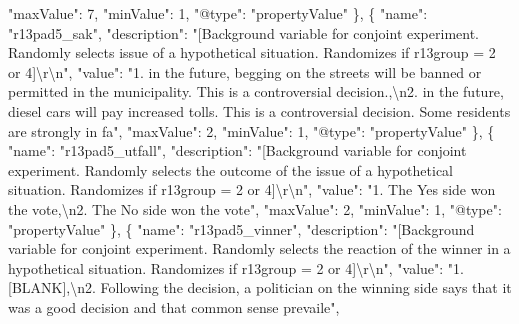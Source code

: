 \documentclass[
]{book}
\newenvironment{Shaded}{\begin{snugshade}}{\end{snugshade}}
\newcommand{\CharTok}[1]{\textcolor[rgb]{0.31,0.60,0.02}{#1}}
\newcommand{\DataTypeTok}[1]{\textcolor[rgb]{0.13,0.29,0.53}{#1}}
\newcommand{\DecValTok}[1]{\textcolor[rgb]{0.00,0.00,0.81}{#1}}
\newcommand{\FunctionTok}[1]{\textcolor[rgb]{0.00,0.00,0.00}{#1}}
\newcommand{\OtherTok}[1]{\textcolor[rgb]{0.56,0.35,0.01}{#1}}
\newcommand{\StringTok}[1]{\textcolor[rgb]{0.31,0.60,0.02}{#1}}
\begin{document}
\begin{Shaded}
\begin{Highlighting}[]
      \DataTypeTok{"maxValue"}\FunctionTok{:} \DecValTok{7}\FunctionTok{,}
      \DataTypeTok{"minValue"}\FunctionTok{:} \DecValTok{1}\FunctionTok{,}
      \DataTypeTok{"@type"}\FunctionTok{:} \StringTok{"propertyValue"}
    \FunctionTok{\}}\OtherTok{,}
    \FunctionTok{\{}
      \DataTypeTok{"name"}\FunctionTok{:} \StringTok{"r13pad5_sak"}\FunctionTok{,}
      \DataTypeTok{"description"}\FunctionTok{:} \StringTok{"[Background variable for conjoint experiment. Randomly selects issue of a hypothetical situation. Randomizes if r13group = 2 or 4]}\CharTok{\textbackslash{}r\textbackslash{}n}\StringTok{"}\FunctionTok{,}
      \DataTypeTok{"value"}\FunctionTok{:} \StringTok{"1. in the future, begging on the streets will be banned or permitted in the municipality. This is a controversial decision.,}\CharTok{\textbackslash{}n}\StringTok{2. in the future, diesel cars will pay increased tolls. This is a controversial decision. Some residents are strongly in fa"}\FunctionTok{,}
      \DataTypeTok{"maxValue"}\FunctionTok{:} \DecValTok{2}\FunctionTok{,}
      \DataTypeTok{"minValue"}\FunctionTok{:} \DecValTok{1}\FunctionTok{,}
      \DataTypeTok{"@type"}\FunctionTok{:} \StringTok{"propertyValue"}
    \FunctionTok{\}}\OtherTok{,}
    \FunctionTok{\{}
      \DataTypeTok{"name"}\FunctionTok{:} \StringTok{"r13pad5_utfall"}\FunctionTok{,}
      \DataTypeTok{"description"}\FunctionTok{:} \StringTok{"[Background variable for conjoint experiment. Randomly selects the outcome of the issue of a hypothetical situation. Randomizes if r13group = 2 or 4]}\CharTok{\textbackslash{}r\textbackslash{}n}\StringTok{"}\FunctionTok{,}
      \DataTypeTok{"value"}\FunctionTok{:} \StringTok{"1. The Yes side won the vote,}\CharTok{\textbackslash{}n}\StringTok{2. The No side won the vote"}\FunctionTok{,}
      \DataTypeTok{"maxValue"}\FunctionTok{:} \DecValTok{2}\FunctionTok{,}
      \DataTypeTok{"minValue"}\FunctionTok{:} \DecValTok{1}\FunctionTok{,}
      \DataTypeTok{"@type"}\FunctionTok{:} \StringTok{"propertyValue"}
    \FunctionTok{\}}\OtherTok{,}
    \FunctionTok{\{}
      \DataTypeTok{"name"}\FunctionTok{:} \StringTok{"r13pad5_vinner"}\FunctionTok{,}
      \DataTypeTok{"description"}\FunctionTok{:} \StringTok{"[Background variable for conjoint experiment. Randomly selects the reaction of the winner in a hypothetical situation. Randomizes if r13group = 2 or 4]}\CharTok{\textbackslash{}r\textbackslash{}n}\StringTok{"}\FunctionTok{,}
      \DataTypeTok{"value"}\FunctionTok{:} \StringTok{"1. [BLANK],}\CharTok{\textbackslash{}n}\StringTok{2. Following the decision, a politician on the winning side says that it was a good decision and that common sense prevaile"}\FunctionTok{,}

\end{Highlighting}
\end{Shaded}
\end{document}
